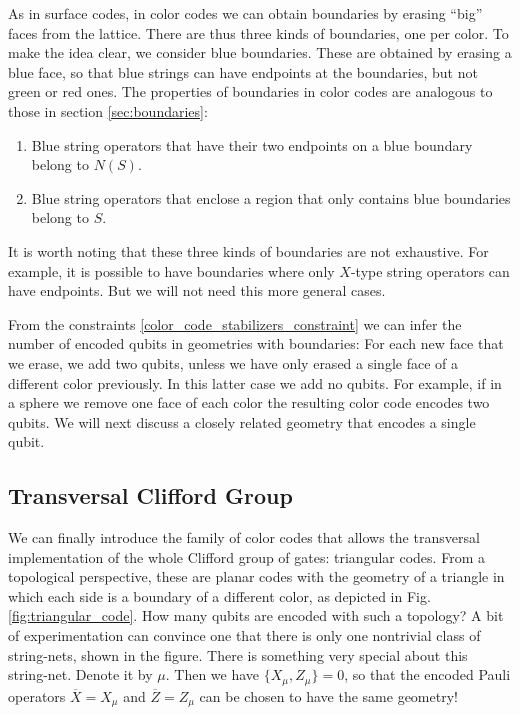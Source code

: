 \documentclass{article}
\newcommand{\sset}[1]{ \{#1\} }
\begin{document}
As in surface codes, in color codes we can obtain boundaries by erasing ``big'' faces from the lattice. There are thus three kinds of boundaries, one per color. To make the idea clear, we consider blue boundaries. These are obtained by erasing a blue face, so that blue strings can have endpoints at the boundaries, but not green or red ones. The properties of boundaries in color codes are analogous to those in section \ref{sec:boundaries}:
\begin{enumerate}
\item Blue string operators that have their two endpoints on a blue boundary belong to $N(S)$.
\item Blue string operators that enclose a region that only contains blue boundaries belong to $S$.
\end{enumerate}
It is worth noting that these three kinds of boundaries are not exhaustive. For example, it is possible to have boundaries where only $X$-type string operators can have endpoints. But we will not need this more general cases.


From the constraints \eqref{color_code_stabilizers_constraint} we can infer the number of encoded qubits in geometries with boundaries: For each new face that we erase, we add two qubits, unless we have only erased a single face of a different color previously. In this latter case we add no qubits. For example, if in a sphere we remove one face of each color the resulting color code encodes two qubits. We will next discuss a closely related geometry that encodes a single qubit.


\subsection{Transversal Clifford Group}

We can finally introduce the family of color codes that allows the transversal implementation of the whole Clifford group of gates: triangular codes. From a topological perspective, these are planar codes with the geometry of a triangle in which each side is a boundary of a different color, as depicted in Fig.\eqref{fig:triangular_code}. How many qubits are encoded with such a topology? A bit of experimentation can convince one that there is only one nontrivial class of string-nets, shown in the figure. There is something very special about this string-net. Denote it by $\mu$. Then we have $\sset {X_\mu,Z_\mu}=0$, so that the encoded Pauli operators $\overline X=X_\mu$ and $\overline Z=Z_\mu$ can be chosen to have the same geometry! 
\end{document}
